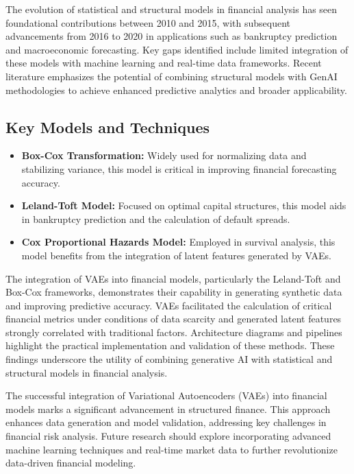 \documentclass[a4paper,headinclude=on,footinclude=on,12pt,oneside]{scrbook}
\begin{document}
	The evolution of statistical and structural models in financial analysis has seen foundational contributions between 2010 and 2015, with subsequent advancements from 2016 to 2020 in applications such as bankruptcy prediction and macroeconomic forecasting. Key gaps identified include limited integration of these models with machine learning and real-time data frameworks. Recent literature emphasizes the potential of combining structural models with GenAI methodologies to achieve enhanced predictive analytics and broader applicability.
	
	\subsection{Key Models and Techniques}
	\begin{itemize}
		\item \textbf{Box-Cox Transformation:} Widely used for normalizing data and stabilizing variance, this model is critical in improving financial forecasting accuracy.
		\item \textbf{Leland-Toft Model:} Focused on optimal capital structures, this model aids in bankruptcy prediction and the calculation of default spreads.
		\item \textbf{Cox Proportional Hazards Model:} Employed in survival analysis, this model benefits from the integration of latent features generated by VAEs.
	\end{itemize}
	
	The integration of VAEs into financial models, particularly the Leland-Toft and Box-Cox frameworks, demonstrates their capability in generating synthetic data and improving predictive accuracy. VAEs facilitated the calculation of critical financial metrics under conditions of data scarcity and generated latent features strongly correlated with traditional factors. Architecture diagrams and pipelines highlight the practical implementation and validation of these methods. These findings underscore the utility of combining generative AI with statistical and structural models in financial analysis.
	
	The successful integration of Variational Autoencoders (VAEs) into financial models marks a significant advancement in structured finance. This approach enhances data generation and model validation, addressing key challenges in financial risk analysis. Future research should explore incorporating advanced machine learning techniques and real-time market data to further revolutionize data-driven financial modeling.
	
\end{document}
